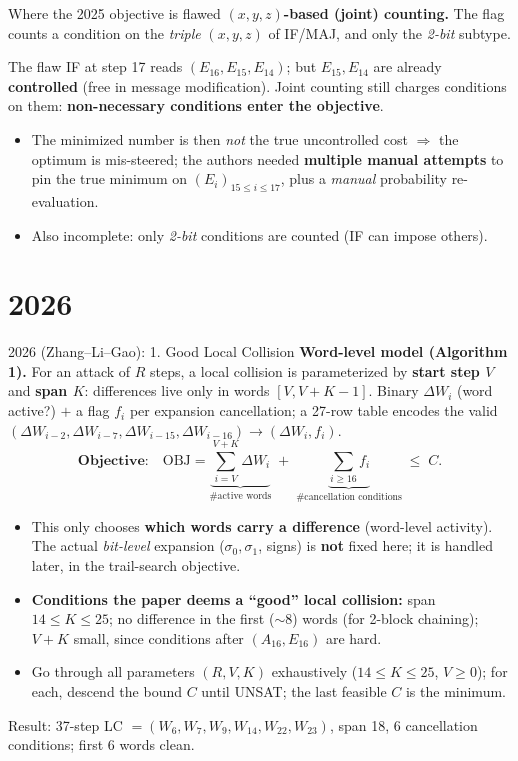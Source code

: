 \documentclass[aspectratio=169,9pt]{beamer}
\newcommand{\key}[1]{\textcolor{key}{\textbf{#1}}}
\begin{document}
\begin{frame}{Where the 2025 objective is flawed}
\textbf{$(x,y,z)$-based (joint) counting.} The flag counts a condition on the \emph{triple} $(x,y,z)$ of IF/MAJ, and only the \emph{2-bit} subtype.
\begin{alertblock}{The flaw}
 IF at step 17 reads $(E_{16},E_{15},E_{14})$; but $E_{15},E_{14}$ are already \key{controlled} (free in message modification). Joint counting still charges conditions on them: \key{non-necessary conditions enter the objective}.
\end{alertblock}
\begin{itemize}
  \item The minimized number is then \emph{not} the true uncontrolled cost $\Rightarrow$ the optimum is mis-steered; the authors needed \key{multiple manual attempts} to pin the true minimum on $(E_i)_{15\le i\le 17}$, plus a \emph{manual} probability re-evaluation.
  \item Also incomplete: only \emph{2-bit} conditions are counted (IF can impose others).
\end{itemize}
\end{frame}

\section{2026}

\begin{frame}{2026 (Zhang--Li--Gao): 1. Good Local Collision}
\textbf{Word-level model (Algorithm 1).} For an attack of $R$ steps, a local collision is parameterized by \key{start step $V$} and \key{span $K$}: differences live only in words $[V,V{+}K{-}1]$. Binary $\Delta W_i$ (word active?) $+$ a flag $f_i$ per expansion cancellation; a 27-row table encodes the valid $(\Delta W_{i-2},\Delta W_{i-7},\Delta W_{i-15},\Delta W_{i-16})\to(\Delta W_i,f_i)$.
\[
\textbf{Objective:}\quad \mathrm{OBJ}=\underbrace{\textstyle\sum_{i=V}^{V+K}\Delta W_i}_{\text{\# active words}}\;+\;\underbrace{\textstyle\sum_{i\ge 16} f_i}_{\text{\# cancellation conditions}}\;\le\; C.
\]
\begin{itemize}
  \item This only chooses \key{which words carry a difference} (word-level activity). The actual \emph{bit-level} expansion ($\sigma_0,\sigma_1$, signs) is \key{not} fixed here; it is handled later, in the trail-search objective.
  \item \textbf{Conditions the paper deems a ``good'' local collision:} span $14\le K\le 25$; no difference in the first ($\sim$8) words (for 2-block chaining); $V{+}K$ small, since conditions after $(A_{16},E_{16})$ are hard.
    \item Go through all parameters $(R,V,K)$ exhaustively ($14\le K\le 25$, $V\ge 0$); for each, descend the bound $C$ until UNSAT; the last feasible $C$ is the minimum.
\end{itemize}
\small Result: 37-step LC $=(W_6,W_7,W_9,W_{14},W_{22},W_{23})$, span 18, 6 cancellation conditions; first 6 words clean.
\end{frame}
\end{document}

